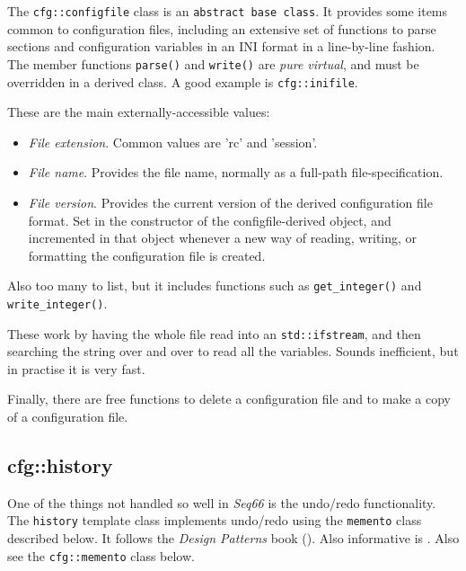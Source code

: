    The \texttt{cfg::configfile} class is an \texttt{abstract base class}.
   It provides some items common to configuration files, including
   an extensive set of functions to parse sections and configuration
   variables in an INI format in a line-by-line fashion.
   The member functions \texttt{parse()} and \texttt{write()}
   are \textsl{pure virtual}, and must be overridden in a derived class.
   A good example is \texttt{cfg::inifile}.

   These are the main externally-accessible values:

   \begin{itemize}
      \item \textsl{File extension}.
         Common values are 'rc' and 'session'.
      \item \textsl{File name}.
         Provides the file name, normally as a full-path file-specification.
      \item \textsl{File version}.
         Provides the current version of the derived configuration file format.
         Set in the constructor of the configfile-derived object,
         and incremented in that object whenever a new way of reading,
         writing, or formatting the configuration file is created.
   \end{itemize}

   Also too many to list, but it includes functions such as
   \texttt{get\_integer()} and \texttt{write\_integer()}.

   These work by having the whole file read into an
   \texttt{std::ifstream}, and then searching the string over and over
   to read all the variables.
   Sounds inefficient, but in practise it is very fast.

   Finally, there are free functions to delete a configuration file and
   to make a copy of a configuration file.

\subsection{cfg::history}
\label{subsec:cfg_namespace_history}

   One of the things not handled so well in \textsl{Seq66} is the
   undo/redo functionality.
   The \texttt{history} template class implements undo/redo using the 
   \texttt{memento} class described below. It follows
   the \textsl{Design Patterns} book (\cite{dpatterns}).
   Also informative is \cite{deque}.
   Also see the \texttt{cfg::memento} class below.

